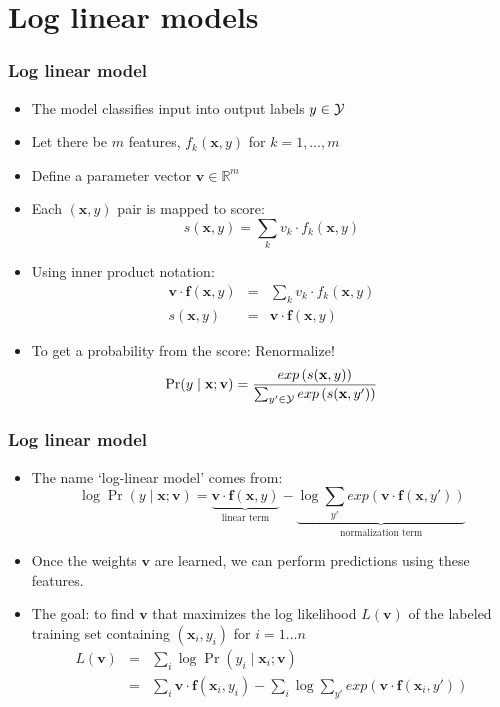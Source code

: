 \section{Log linear models}
\frame{\tableofcontents[currentsection]}

\begin{frame}
\frametitle{Log linear model}
\begin{itemize}[<+->]
\item The model classifies input into output labels $y \in {\cal Y}$
\item Let there be $m$ features, $f_k(\textbf{x}, y)$ for $k = 1, \ldots, m$
\item Define a parameter vector $\textbf{v} \in \mathbb{R}^m$
\item Each $(\textbf{x}, y)$ pair is mapped to score:
\[ s(\textbf{x}, y) = \sum_k v_k \cdot f_k(\textbf{x}, y) \]
\item Using inner product notation:
\begin{eqnarray*}
\textbf{v} \cdot \textbf{f}(\textbf{x}, y) & = & \sum_k v_k \cdot f_k(\textbf{x}, y) \\
s(\textbf{x}, y) & = & \textbf{v} \cdot \textbf{f}(\textbf{x}, y) 
\end{eqnarray*}
\item To get a probability from the score: Renormalize! 
\[ \Pr(y \mid \textbf{x}; \textbf{v}) = \frac{exp\left(s(\textbf{x}, y)\right)}{\sum_{y' \in {\cal Y}} exp\left(s(\textbf{x}, y')\right)} \]
\end{itemize}
\end{frame}

\begin{frame}
\frametitle{Log linear model}
\begin{itemize}[<+->]
\item The name `log-linear model' comes from:
\[ \log \Pr(y \mid \textbf{x}; \textbf{v}) = \underbrace{\textbf{v} \cdot \textbf{f}(\textbf{x}, y)}_{\textrm{linear term}} - \underbrace{\log \sum_{y'} exp\left( \textbf{v} \cdot \textbf{f}(\textbf{x}, y') \right)}_{\textrm{normalization term}} \]
\item Once the weights $\textbf{v}$ are learned, we can perform predictions using these features.
\item The goal: to find $\textbf{v}$ that maximizes the log likelihood $L(\textbf{v})$ of the labeled training set containing $(\textbf{x}_i, y_i)$ for $i = 1 \ldots n$
\begin{eqnarray*}
L(\textbf{v}) &=& \sum_{i} \log \Pr(y_i \mid \textbf{x}_i; \textbf{v}) \\
&=& \sum_i \textbf{v} \cdot \textbf{f}(\textbf{x}_i, y_i) - \sum_i \log \sum_{y'} exp\left( \textbf{v} \cdot \textbf{f}(\textbf{x}_i, y') \right) 
\end{eqnarray*}
\end{itemize}
\end{frame}

